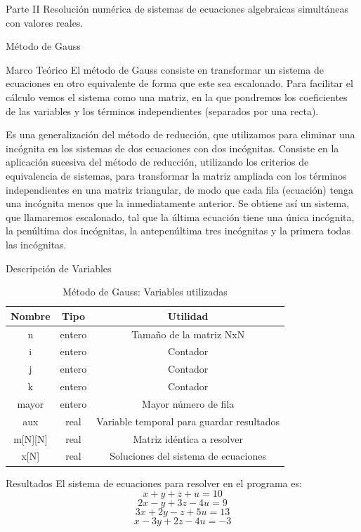 \documentclass[legalpaper, 12pt]{article}
\begin{document}
  \begin{section}{Parte II}
    Resolución numérica de sistemas de ecuaciones algebraicas
    simultáneas con valores reales.
    \begin{subsection}{Método de Gauss}
      \begin{subsubsection}{Marco Teórico}
        El método de Gauss consiste en transformar un sistema de ecuaciones
        en otro equivalente de forma que este sea escalonado.
        Para facilitar el cálculo vemos el sistema como una matriz,
        en la que pondremos los coeficientes de las variables y los términos
        independientes (separados por una recta).

        Es una generalización del método de reducción, que utilizamos para eliminar
        una incógnita en los sistemas de dos ecuaciones con dos incógnitas.
        Consiste en la aplicación sucesiva del método de reducción, utilizando los
        criterios de equivalencia de sistemas, para transformar la matriz ampliada
        con los términos independientes en una matriz triangular, de modo que cada
        fila (ecuación) tenga una incógnita menos que la inmediatamente anterior.
        Se obtiene así un sistema, que llamaremos escalonado, tal que la última
        ecuación tiene una única incógnita, la penúltima dos incógnitas,
        la antepenúltima tres incógnitas y la primera todas las incógnitas.
      \end{subsubsection}
      \begin{subsubsection}{Descripción de Variables}
        \begin{table}[h]
          \centering
          \begin{tabular}{|c c c|}
            \hline
            Nombre & Tipo & Utilidad\\
            \hline\hline
            n & entero & Tamaño de la matriz NxN\\
            i & entero & Contador \\
            j & entero & Contador \\
            k & entero & Contador \\
            mayor & entero & Mayor número de fila \\
            aux & real & Variable temporal para guardar resultados \\
            m[N][N] & real & Matriz idéntica a resolver \\
            x[N] & real & Soluciones del sistema de ecuaciones \\
            \hline
          \end{tabular}
          \caption{Método de Gauss: Variables utilizadas}
        \end{table}
      \end{subsubsection}
      \newpage
      \begin{subsubsection}{Resultados}
        El sistema de ecuaciones para resolver en el programa es:
        \[x+y+z+u=10\]
        \[2x-y+3z-4u=9\]
        \[3x+2y-z+5u=13\]
        \[x-3y+2z-4u=-3\]


\end{subsubsection}
\end{subsection}
\end{section}
\end{document}
